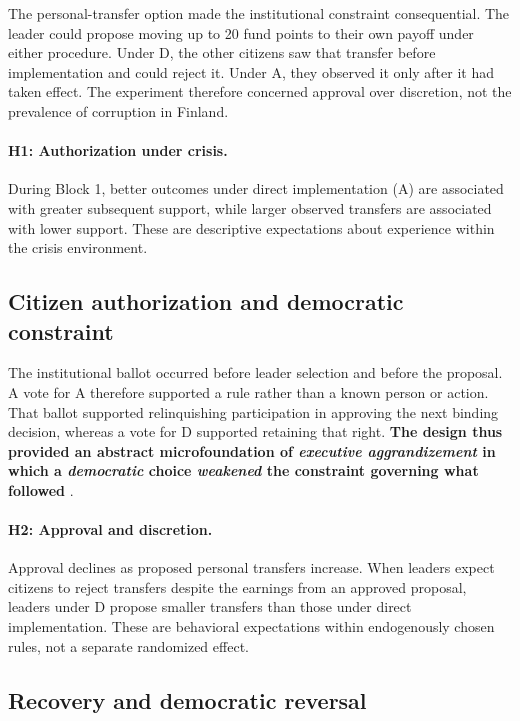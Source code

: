 \documentclass[11pt]{article}
\newcommand{\Dproc}{\textsf{D}}
\newcommand{\Aproc}{\textsf{A}}
\begin{document}
The personal-transfer option made the institutional constraint consequential. The leader could propose moving up to 20 fund points to their own payoff under either procedure. Under \Dproc{}, the other citizens saw that transfer before implementation and could reject it. Under \Aproc{}, they observed it only after it had taken effect. The experiment therefore concerned approval over discretion, not the prevalence of corruption in Finland.

\paragraph{H1: Authorization under crisis.} During Block 1, better outcomes under direct implementation (\Aproc{}) are associated with greater subsequent support, while larger observed transfers are associated with lower support. These are descriptive expectations about experience within the crisis environment.

\subsection{Citizen authorization and democratic constraint}

The institutional ballot occurred before leader selection and before the proposal. A vote for \Aproc{} therefore supported a rule rather than a known person or action. That ballot supported relinquishing participation in approving the next binding decision, whereas a vote for \Dproc{} supported retaining that right. {\bf The design thus provided an abstract microfoundation of \emph{executive aggrandizement} in which a \emph{democratic} choice \emph{weakened} the constraint governing what followed} \parencites{Bermeo2016,FortezaMussioPereyra2024}.

\paragraph{H2: Approval and discretion.} Approval declines as proposed personal transfers increase. When leaders expect citizens to reject transfers despite the earnings from an approved proposal, leaders under \Dproc{} propose smaller transfers than those under direct implementation. These are behavioral expectations within endogenously chosen rules, not a separate randomized effect.

\subsection{Recovery and democratic reversal}
\end{document}
